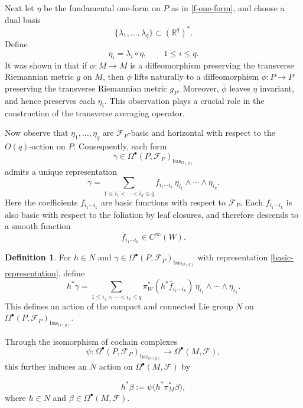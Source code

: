 \documentclass[reqno, 11pt]{amsart}
\theoremstyle{definition}
\newtheorem{defn}[thm]{Definition}
\theoremstyle{property}
\theoremstyle{remark}
\numberwithin{equation}{section}
\begin{document}
Next let $\eta$ be the fundamental one-form on $P$ as in
\eqref{f-one-form}, and choose a dual basis
\[
\{\lambda_1,\dots,\lambda_q\}\subset (\mathbb{R}^q)^*.
\]
Define
\begin{equation}\label{co-frame}
\eta_i=\lambda_i\circ \eta,
\qquad
1\le i\le q.
\end{equation}
It was shown in \cite{Mo88} that if $\phi:M\to M$ is a diffeomorphism
preserving the transverse Riemannian metric $g$ on $M$, then $\phi$ lifts
naturally to a diffeomorphism $\bar{\phi}:P\to P$ preserving the transverse
Riemannian metric $g_P$. Moreover, $\bar{\phi}$ leaves $\eta$ invariant, and
hence preserves each $\eta_i$. This observation plays a crucial role in the
construction of the transverse averaging operator.

Now observe that $\eta_1,\dots,\eta_q$ are $\mathcal{F}_P$-basic and horizontal
with respect to the $O(q)$-action on $P$. Consequently, each form
\[
\gamma\in \Omega^\bullet(P,\mathcal{F}_P)_{\mathrm{bas}_{O(q)}}
\]
admits a unique representation
\begin{equation}\label{basic-representation}
\gamma=
\sum_{1\le i_1<\cdots<i_k\le q}
f_{i_1\cdots i_k}\,
\eta_{i_1}\wedge\cdots\wedge \eta_{i_k}.
\end{equation}
Here the coefficients $f_{i_1\cdots i_k}$ are basic functions with respect to
$\mathcal{F}_P$. Each $f_{i_1\cdots i_k}$ is also basic with respect to the
foliation by leaf closures, and therefore descends to a smooth function
\[
\bar{f}_{i_1\cdots i_k}\in C^\infty(W).
\]

\begin{defn}\label{action-on-forms}
For $h\in N$ and $
\gamma\in \Omega^\bullet(P,\mathcal{F}_P)_{\mathrm{bas}_{O(q)}}$ 
with representation \eqref{basic-representation}, define
\begin{equation}\label{action-formula}
h^*\gamma=
\sum_{1\le i_1<\cdots<i_k\le q}
\pi_W^*(h^*\bar{f}_{i_1\cdots i_k})\,
\eta_{i_1}\wedge\cdots\wedge \eta_{i_k}.
\end{equation}
This defines an action of the compact and connected Lie group $N$ on
$\Omega^\bullet(P,\mathcal{F}_P)_{\mathrm{bas}_{O(q)}}$. 

Through the isomorphism of cochain complexes
\[
\psi:
\Omega^\bullet(P,\mathcal{F}_P)_{\mathrm{bas}_{O(q)}}
\to
\Omega^\bullet(M,\mathcal{F}),
\]
this further induces an $N$ action on $\Omega^\bullet(M,\mathcal{F})$ by

\begin{equation}\label{action-formula2}
h^*\beta:=\psi\bigl(h^*\pi_M^*\beta\bigr), 
\end{equation}
where $h\in N$ and $\beta \in \Omega^\bullet(M,\mathcal{F})$.
\end{defn}
\end{document}
